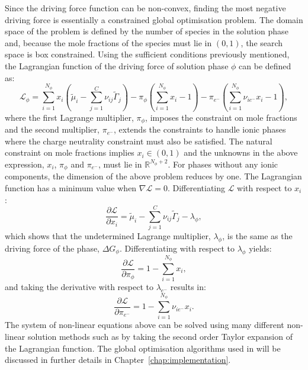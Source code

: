 Since the driving force function can be non-convex, finding the most negative driving force is essentially a constrained global optimisation problem. The domain space of  the problem is defined by the number of species in the solution phase and, because the mole fractions of the species must lie in $(0,1)$, the search space is box constrained. Using the sufficient conditions previously mentioned, the Lagrangian function of the driving force of solution phase $\phi$ can be defined as:
	\begin{equation}\label{eq:DrivingForceLagrangian}
		\mathcal{L}_\phi = \sum_{i=1}^{N_\phi} x_i \left(\tilde{\mu}_i - \sum_{j=1}^{C} \nu_{ij} \tilde{\Gamma}_j \right)
						 - \pi_\phi \left( \sum_{i=1}^{N_\phi} x_i - 1 \right)
						 - \pi_{e^-} \left( \sum_{i=1}^{N_\phi} \nu_{i {e^-}} x_i - 1 \right),
	\end{equation}
	where the first Lagrange multiplier, $\pi_{\phi}$, imposes the constraint on mole fractions and the second multiplier, $\pi_{e^-}$, extends the constraints to handle ionic phases where the charge neutrality constraint must also be satisfied. The natural constraint on mole fractions implies $x_i \in (0, 1)$ and the  unknowns in the above expression, $x_i$, $\pi_{\phi}$ and $\pi_{e^-}$, must lie in $\mathbb{R}^{N_\phi + 2}$. For phases without any ionic components, the dimension of the above problem reduces by one.  The Lagrangian function has a minimum value when $\nabla \mathcal{L} = 0$. Differentiating $\mathcal{L}$ with respect to $x_i$:
	\begin{equation}
		\frac{\partial \mathcal{L}}{\partial x_i}	= \tilde{\mu}_i -  \sum_{j=1}^{C} \nu_{ij} \tilde{\Gamma}_j - \lambda_\phi,
	\end{equation}
	which shows that the undetermined Lagrange multiplier, $\lambda_\phi$, is the same as the driving force of the phase, $\Delta G_\phi$. Differentiating with respect to $\lambda_\phi$ yields:
	\begin{equation}
		\frac{\partial \mathcal{L}}{\partial \pi_\phi}	= 1 - \sum_{i=1}^{N_\phi} x_i,
	\end{equation}
	and taking the derivative with respect to $\lambda_{e^-}$ results in:
	\begin{equation}
		\frac{\partial \mathcal{L}}{\partial \pi_{e^-}}	= 1 - \sum_{i=1}^{N_\phi} \nu_{i {e^-}} x_i.
	\end{equation}
	The system of non-linear equations above can be solved using many different non-linear solution methods such as by taking the second order Taylor expansion of the Lagrangian function. The global optimisation algorithms used in {\GEM} will be discussed in further details in Chapter~\ref{chap:implementation}.

